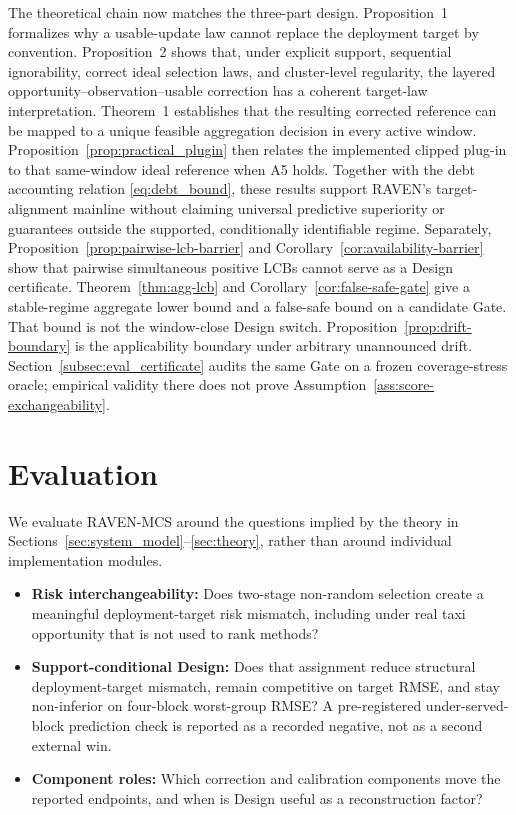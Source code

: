 \documentclass[letterpaper,journal]{IEEEtran}
\begin{document}
The theoretical chain now matches the three-part design.  Proposition~1
formalizes why a usable-update law cannot replace the deployment target by
convention.  Proposition~2 shows that, under explicit support, sequential
ignorability, correct ideal selection laws, and cluster-level regularity, the
layered opportunity--observation--usable correction has a coherent target-law
interpretation.  Theorem~1 establishes that the resulting corrected reference
can be mapped to a unique feasible aggregation decision in every active window.
Proposition~\ref{prop:practical_plugin} then relates the implemented
clipped plug-in to that same-window ideal reference when A5 holds.
Together with the debt accounting relation
\eqref{eq:debt_bound}, these results support RAVEN's target-alignment mainline
without claiming universal predictive superiority or guarantees outside the
supported, conditionally identifiable regime.  Separately,
Proposition~\ref{prop:pairwise-lcb-barrier} and
Corollary~\ref{cor:availability-barrier} show that pairwise simultaneous
positive LCBs cannot serve as a Design certificate.
Theorem~\ref{thm:agg-lcb} and Corollary~\ref{cor:false-safe-gate} give a
stable-regime aggregate lower bound and a false-safe bound on a candidate
Gate.  That bound is not the window-close Design switch.
Proposition~\ref{prop:drift-boundary} is the applicability boundary under
arbitrary unannounced drift.  Section~\ref{subsec:eval_certificate}
audits the same Gate on a frozen coverage-stress oracle; empirical
validity there does not prove Assumption~\ref{ass:score-exchangeability}.

\section{Evaluation}
\label{sec:evaluation}

We evaluate RAVEN-MCS around the questions implied by the theory in
Sections~\ref{sec:system_model}--\ref{sec:theory}, rather than around individual
implementation modules.

\begin{itemize}
    \item \textbf{Risk interchangeability:} Does two-stage non-random
    selection create a meaningful deployment-target risk mismatch,
    including under real taxi opportunity that is not used to rank
    methods?
    \item \textbf{Support-conditional Design:} Does that assignment reduce
    structural deployment-target mismatch, remain competitive on
    target RMSE, and stay non-inferior on four-block worst-group RMSE?
    A pre-registered under-served-block prediction check is reported
    as a recorded negative, not as a second external win.
    \item \textbf{Component roles:} Which correction and calibration
    components move the reported endpoints, and when is Design useful as
    a reconstruction factor?
\end{itemize}
\end{document}
